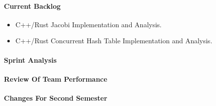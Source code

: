 \documentclass[10pt,a4paper]{report}
\begin{document}
\paragraph{Current Backlog}
\begin{flushleft}
	\begin{itemize}
		\item C++/Rust Jacobi Implementation and Analysis.
		\item C++/Rust Concurrent Hash Table Implementation and Analysis.
	\end{itemize}
\end{flushleft}
\paragraph{Sprint Analysis}
\paragraph{Review Of Team Performance}
\paragraph{Changes For Second Semester}
\end{document}
